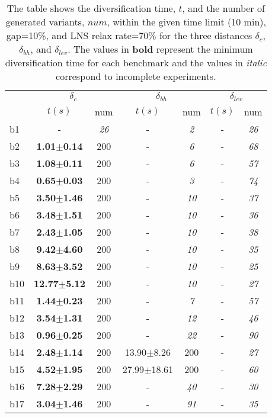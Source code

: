 \begin{longtable}{|l|c|c|c|c|c|c|}
\caption{\label{tab:distances}{The table shows 
		      the diversification time, $t$, and the number of generated
		      variants, $num$, within the given time limit (10 min), gap=10\%,
		      and \ac{LNS} relax rate=70\%
		      for the three distances $\delta_c$, $\delta_{bh}$,
		      and $\delta_{lev}$.
		      The values in  \textbf{bold} represent the minimum 
		      diversification time for each benchmark and the values in \emph{italic} 
		      correspond to incomplete experiments.}}\\
\hline
&\multicolumn{2}{c|}{$\delta_c$}&\multicolumn{2}{c|}{$\delta_{bh}$}&\multicolumn{2}{c|}{$\delta_{lev}$}\\
\cline{2-7}
&$t(s)$&num&$t(s)$&num&$t(s)$&num\\
\hline
b1&- & \textit{26 }&- & \textit{2 }&- & \textit{26 }
\\
b2&\textbf{1.01$\pm$0.14} & 200 &- & \textit{6 }&- & \textit{68 }
\\
b3&\textbf{1.08$\pm$0.11} & 200 &- & \textit{6 }&- & \textit{57 }
\\
b4&\textbf{0.65$\pm$0.03} & 200 &- & \textit{3 }&- & \textit{74 }
\\
b5&\textbf{3.50$\pm$1.46} & 200 &- & \textit{10 }&- & \textit{37 }
\\
b6&\textbf{3.48$\pm$1.51} & 200 &- & \textit{10 }&- & \textit{36 }
\\
b7&\textbf{2.43$\pm$1.05} & 200 &- & \textit{10 }&- & \textit{38 }
\\
b8&\textbf{9.42$\pm$4.60} & 200 &- & \textit{10 }&- & \textit{35 }
\\
b9&\textbf{8.63$\pm$3.52} & 200 &- & \textit{10 }&- & \textit{25 }
\\
b10&\textbf{12.77$\pm$5.12} & 200 &- & \textit{10 }&- & \textit{27 }
\\
b11&\textbf{1.44$\pm$0.23} & 200 &- & \textit{7 }&- & \textit{57 }
\\
b12&\textbf{3.54$\pm$1.31} & 200 &- & \textit{12 }&- & \textit{46 }
\\
b13&\textbf{0.96$\pm$0.25} & 200 &- & \textit{22 }&- & \textit{90 }
\\
b14&\textbf{2.48$\pm$1.14} & 200 &13.90$\pm$8.26 & 200 &- & \textit{27 }
\\
b15&\textbf{4.52$\pm$1.95} & 200 &27.99$\pm$18.61 & 200 &- & \textit{60 }
\\
b16&\textbf{7.28$\pm$2.29} & 200 &- & \textit{40 }&- & \textit{30 }
\\
b17&\textbf{3.04$\pm$1.46} & 200 &- & \textit{91 }&- & \textit{35 }
\\
\hline
\end{longtable}
